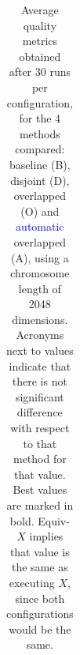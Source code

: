 \documentclass[preprint]{elsarticle}
\begin{document}
\begin{table}
{\begin{tabular}{|c||c|c|c|c||c|c|c|c||c|c|c|c||}
\end{tabular}
}
\caption{Average quality metrics obtained after 30 runs per configuration, for the 4 methods compared: baseline (B), disjoint (D), overlapped (O) and \textcolor{blue}{automatic} overlapped (A), using a chromosome length of 2048 dimensions. Acronyms next to values indicate that there is not significant difference with respect to that method for that value. Best values are marked in bold. Equiv-$X$ implies that value is the same as executing $X$, since both configurations would be the same.}
\label{tab:results2048}
\end{table}






\begin{table}
\centering
{}
\end{table}
\end{document}
